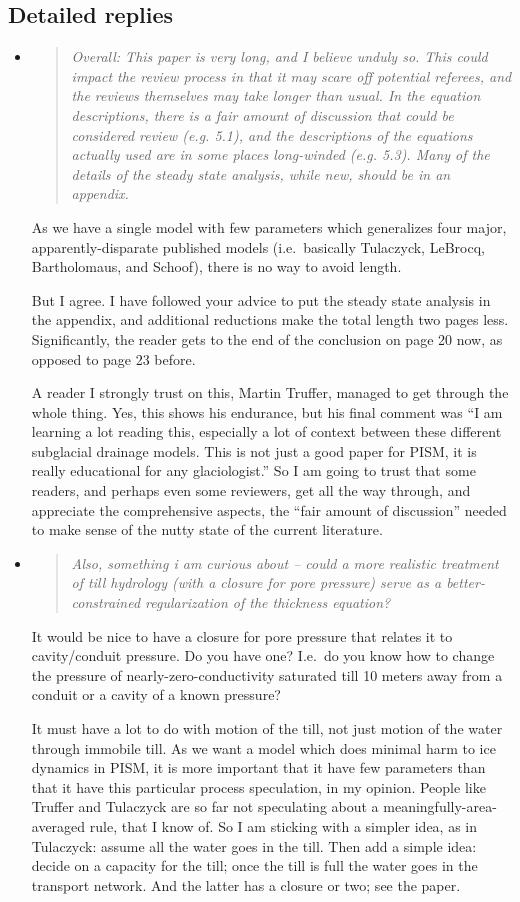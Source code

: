 \documentclass[11pt,reqno]{amsart}
\newcommand{\reply}[2]{
\medskip\medskip
\item  \begin{quote}
\emph{#1}
\end{quote}

\medskip
\noindent #2}
\begin{document}
\subsection*{Detailed replies}  
\begin{itemize}
\reply{Overall: This paper is very long, and I believe unduly so. This could impact the review process in that it may scare off potential referees, and the reviews themselves may take longer than usual. In the equation descriptions, there is a fair amount of discussion that could be considered review (e.g. 5.1), and the descriptions of the equations actually used are in some places long-winded (e.g. 5.3). Many of the details of the steady state analysis, while new, should be in an appendix.}{As we have a single model with few parameters which generalizes four major, apparently-disparate published models (i.e.~basically Tulaczyck, LeBrocq, Bartholomaus, and Schoof), there is no way to avoid length.

\medskip
But I agree.  I have followed your advice to put the steady state analysis in the appendix, and additional reductions make the total length two pages less.  Significantly, the reader gets to the end of the conclusion on page 20 now, as opposed to page 23 before.

\medskip
A reader I strongly trust on this, Martin Truffer, managed to get through the whole thing.  Yes, this shows his endurance, but his final comment was ``I am learning a lot reading this, especially a lot of context between these different subglacial drainage models. This is not just a good paper for PISM, it is really educational for any glaciologist.''  So I am going to trust that some readers, and perhaps even some reviewers, get all the way through, and appreciate the comprehensive aspects, the ``fair amount of discussion'' needed to make sense of the nutty state of the current literature.}

\reply{Also, something i am curious about -- could a more realistic treatment of till hydrology (with a closure for pore pressure) serve as a better-constrained regularization of the thickness equation?}{It would be nice to have a closure for pore pressure that relates it to cavity/conduit pressure.  Do you have one?  I.e.~do you know how to change the pressure of nearly-zero-conductivity saturated till 10 meters away from a conduit or a cavity of a known pressure?

\medskip
It must have a lot to do with motion of the till, not just motion of the water through immobile till.  As we want a model which does minimal harm to ice dynamics in PISM, it is more important that it have few parameters than that it have this particular process speculation, in my opinion.  People like Truffer and Tulaczyck are so far not speculating about a meaningfully-area-averaged rule, that I know of.  So I am sticking with a simpler idea, as in Tulaczyck: assume all the water goes in the till.  Then add a simple idea: decide on a capacity for the till; once the till is full the water goes in the transport network.  And the latter has a closure or two; see the paper.

}
\end{itemize}
\end{document}
